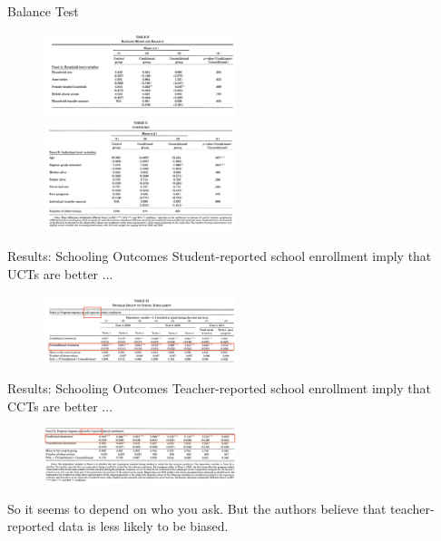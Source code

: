 \documentclass[11pt,notes=hide,aspectratio=169,mathserif]{beamer}
\begin{document}
\begin{frame}{Balance Test}
\begin{figure}
\centering
\includegraphics[width=0.5\textwidth]{inputs/table4.png}\\
\vspace{0.0cm} 
\includegraphics[width=0.5\textwidth]{inputs/table5.png}
\end{figure}
\end{frame}

\begin{frame}{Results: Schooling Outcomes}
Student-reported school enrollment imply that UCTs are better ...
\begin{figure}
\centering
\includegraphics[width=0.5\textwidth]{inputs/table6.png}
\end{figure}
\end{frame}

\begin{frame}{Results: Schooling Outcomes}
Teacher-reported school enrollment imply that CCTs are better ...
\begin{figure}
\centering
\includegraphics[width=0.5\textwidth]{inputs/table7.png}
\end{figure}
So it seems to depend on who you ask.
But the authors believe that teacher-reported data is less likely to be biased. 
\end{frame}
\end{document}
